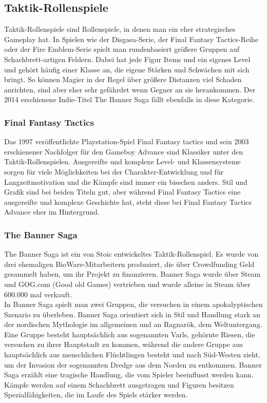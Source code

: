 \documentclass[extern,palatino]{cgBA}
\begin{document}
\subsection{Taktik-Rollenspiele}
Taktik-Rollenspiele sind Rollenspiele, in denen man ein eher strategisches Gameplay hat. In Spielen wie der Disgaea-Serie, der Final Fantasy Tactics-Reihe oder der Fire Emblem-Serie spielt man rundenbasiert größere Gruppen auf Schachbrett-artigen Feldern. Dabei hat jede Figur Items und ein eigenes Level und gehört häufig einer Klasse an, die eigene Stärken und Schwächen mit sich bringt. So können Magier in der Regel über größere Distanzen viel Schaden anrichten, sind aber eher sehr gefährdet wenn Gegner an sie herankommen. Der 2014 erschienene Indie-Titel The Banner Saga fällt ebenfalls in diese Kategorie.
\subsubsection{Final Fantasy Tactics}
Das 1997 veröffentlichte Playstation-Spiel Final Fantasy tactics und sein 2003 erschienener Nachfolger für den Gameboy Advance sind Klassiker unter den Taktik-Rollenspielen. Ausgereifte und komplexe Level- und Klassensysteme sorgen für viele Möglichkeiten bei der Charakter-Entwicklung und für Langzeitmotivation und die Kämpfe sind immer ein bisschen anders. Stil und Grafik sind bei beiden Titeln gut, aber während Final Fantasy Tactics eine ausgereifte und komplexe Geschichte hat, steht diese bei Final Fantasy Tactics Advance eher im Hintergrund.
\subsubsection{The Banner Saga}
The Banner Saga ist ein von Stoic entwickeltes Taktik-Rollenspiel. Es wurde von drei ehemaligen BioWare-Mitarbeitern produziert, die über Crowdfunding Geld gesammelt haben, um ihr Projekt zu finanzieren. Banner Saga wurde über Steam und GOG.com (Good old Games) vertrieben und wurde alleine in Steam über 600.000 mal verkauft.
\\In Banner Saga spielt man zwei Gruppen, die versuchen in einem apokalyptischen Szenario zu überleben. Banner Saga orientiert sich in Stil und Handlung stark an der nordischen Mythologie im allgemeinen und an Ragnarök, dem Weltuntergang. Eine Gruppe besteht hauptsächlich aus sogenannten Varls, gehörnte Riesen, die versuchen zu ihrer Hauptstadt zu kommen, während die andere Gruppe aus hauptsächlich aus menschlichen Flüchtlingen besteht und nach Süd-Westen zieht, um der Invasion der sogenannten Dredge aus dem Norden zu entkommen.
Banner Saga erzählt eine tragische Handlung, die vom Spieler beeinflusst werden kann. Kämpfe werden auf einem Schachbrett ausgetragen und Figuren besitzen Spezialfähigkeiten, die im Laufe des Spiels stärker werden. 
\end{document}
